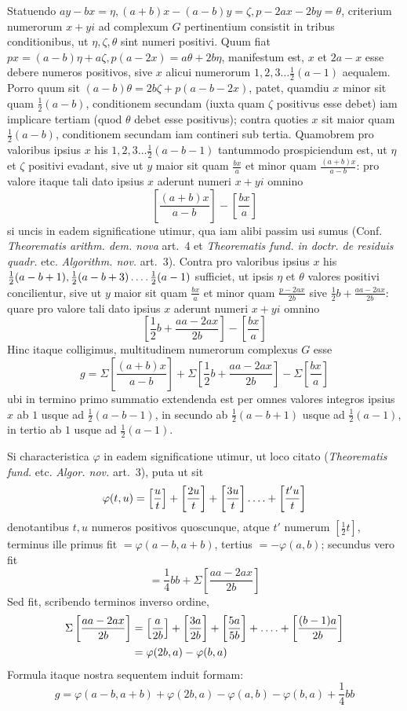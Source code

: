 %
Statuendo $ay-bx=\eta,(a+b)x-(a-b)y=\zeta,p-2ax-2by=\theta$, criterium numerorum $x+yi$ ad complexum $G$ pertinentium consistit in tribus conditionibus, ut $\eta,\zeta,\theta$ sint numeri positivi. Quum fiat $px=(a-b)\eta+a\zeta,p(a-2x)=a\theta+2b\eta$, manifestum est, $x$ et $2a-x$ esse debere numeros positivos, sive $x$ alicui numerorum $1,2,3\ldots\frac12(a-1)$ aequalem. Porro quum sit $(a-b)\theta=2b\zeta+p(a-b-2x)$, patet, quamdiu $x$ minor sit quam $\frac12(a-b)$, conditionem secundam (iuxta quam $\zeta$ positivus esse debet) iam implicare tertiam (quod $\theta$ debet esse positivus); contra quoties $x$ sit maior quam $\frac12(a-b)$, conditionem secundam iam contineri sub tertia. Quamobrem pro valoribus ipsius $x$ his $1,2,3\ldots\frac12(a-b-1)$ tantummodo prospiciendum est, ut $\eta$ et $\zeta$ positivi evadant, sive ut $y$ maior sit quam $\frac{bx}{a}$ et minor quam $\frac{(a+b)x}{a-b}$: pro valore itaque tali dato ipsius $x$ aderunt numeri $x+yi$ omnino
\[
\left[\frac{(a+b)x}{a-b}\right]-\left[\frac{bx}{a}\right]
\]
si uncis in eadem significatione utimur, qua iam alibi passim usi sumus (Conf. \emph{Theorematis arithm. dem. nova} art.~4 et \emph{Theorematis fund. in doctr. de residuis quadr.} etc. \emph{Algorithm. nov.} art.~3). Contra pro valoribus ipsius $x$ his $\frac12(a-b+1),\frac12(a-b+3)\mathinner{.\,.\,.\,.}\frac12(a-1)$ sufficiet, ut ipsis $\eta$ et $\theta$ valores positivi concilientur, sive ut $y$ maior sit quam $\frac{bx}{a}$ et minor quam $\frac{p-2ax}{2b}$ sive $\frac12b+\frac{aa-2ax}{2b}$: quare pro valore tali dato ipsius $x$ aderunt numeri $x+yi$ omnino
\[
\left[\frac12b+\frac{aa-2ax}{2b}\right]-\left[\frac{bx}{a}\right]
\]
Hinc itaque colligimus, multitudinem numerorum complexus $G$ esse
\[
g=\Sigma\left[\frac{(a+b)x}{a-b}\right]+\Sigma\left[\frac12b+\frac{aa-2ax}{2b}\right]-\Sigma\left[\frac{bx}{a}\right]
\]
ubi in termino primo summatio extendenda est per omnes valores integros ipsius $x$ ab $1$ usque ad $\frac12(a-b-1)$, in secundo ab $\frac12(a-b+1)$ usque ad $\frac12(a-1)$, in tertio ab $1$ usque ad $\frac12(a-1)$.

Si characteristica $\varphi$ in eadem significatione utimur, ut loco citato (\emph{Theorematis fund.} etc. \emph{Algor. nov.} art.~3), puta ut sit
\[
\varphi(t,u)=\left[\frac{u}{t}\right]+\left[\frac{2u}{t}\right]+\left[\frac{3u}{t}\right]\mathinner{.\,.\,.\,.}+\left[\frac{t'u}{t}\right]
\]
denotantibus $t,u$ numeros positivos quoscunque, atque $t'$ numerum $[\frac12t]$, terminus ille primus fit $=\varphi(a-b,a+b)$, tertius $=-\varphi(a,b)$; secundus vero fit
%
\[
=\frac14bb+\Sigma\left[\frac{aa-2ax}{2b}\right]
\]
Sed fit, scribendo terminos inverso ordine,
\[
\begin{aligned}
\Sigma\left[\frac{aa-2ax}{2b}\right]&=\left[\frac{a}{2b}\right]+\left[\frac{3a}{2b}\right]+\left[\frac{5a}{5b}\right]+\mathinner{.\,.\,.\,.}+\left[\frac{(b-1)a}{2b}\right]\\
&=\varphi(2b,a)-\varphi(b,a)
\end{aligned}
\]
Formula itaque nostra sequentem induit formam:
\[
g=\varphi(a-b,a+b)+\varphi(2b,a)-\varphi(a,b)-\varphi(b,a)+\frac14bb
\]

